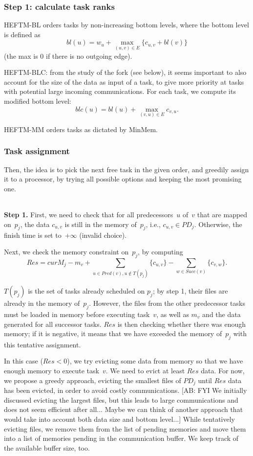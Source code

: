 \documentclass[sigconf,review,anonymous]{acmart}
\newcommand{\curM}{curM}
\newcommand{\PD}{PD}
\newcommand{\AB}[1]{{\color{purple}[AB: #1]}}
\begin{document}
\subsubsection{Step 1: calculate task ranks}

HEFTM-BL orders tasks by non-increasing bottom levels, where the bottom
level is defined as
$$bl(u) = w_u + \max_{(u,v)\in E} \{c_{u,v} + bl(v)\}$$
 (the max is 0 if there is no outgoing edge). 
 
 HEFTM-BLC: from the study of the fork (see below), it seems important
 to also account for the size of the data as input of a task,
 to give more priority at tasks with potential large incoming communications.
 For each task, we compute its modified bottom level: 
 $$blc(u) = bl(u) + \max_{(v,u)\in E} c_{v,u}   . $$
 
 
HEFTM-MM orders tasks as dictated by MinMem.

\subsubsection{Task assignment}

Then, the idea is to pick the next free task in the given order,
and greedily assign it to a processor, by trying all possible options
and keeping the most promising one. 

\medskip
{}\\
{\bf Step 1.} First, we need to check that for all predecessors~$u$ of~$v$ that are mapped
on~$p_j$, the data $c_{u,v}$ is still in the memory of~$p_j$, 
i.e., $c_{u,v}\in PD_j$. Otherwise, the finish time is set to~$+\infty$ (invalid choice). 

\smallskip
{} Next, we check the memory constraint on~$p_j$, by computing
\[Res = \curM_j  - m_v + \sum_{u \in Pred(v), u\notin T(p_j)}  \{c_{u,v}\}
- \sum_{w\in Succ(v)}  \{c_{v,w}\}.\]

$T(p_j)$ is the set of tasks already scheduled on $p_j$; by step 1, their files are
already in the memory of~$p_j$. However, the files from the 
other predecessor tasks must be loaded in memory before executing task~$v$,
as well as $m_v$ and the data generated for all successor tasks.
$Res$ is then checking whether there was enough memory; if it is negative,
it means that we have exceeded the memory of~$p_j$ with this tentative 
assignment. 

In this case ($Res <0$), we  try evicting
some data from memory so that we have enough memory to execute task~$v$. 
We need to evict at least $Res$ data.
For now, we propose a greedy approach, evicting the smallest files of $\PD_j$ until $Res$ data has been evicted,
in order to avoid costly communications. 
\AB{FYI We initially discussed  evicting the largest files, but this leads to 
large communications and does not seem efficient after all... Maybe we can think of another 
approach that would take into account both data size and bottom level...}
While tentatively evicting files, we remove them from the list of pending memories and move them into a list
    of memories pending in the communication buffer.
We keep track of the available buffer size, too.
\end{document}
